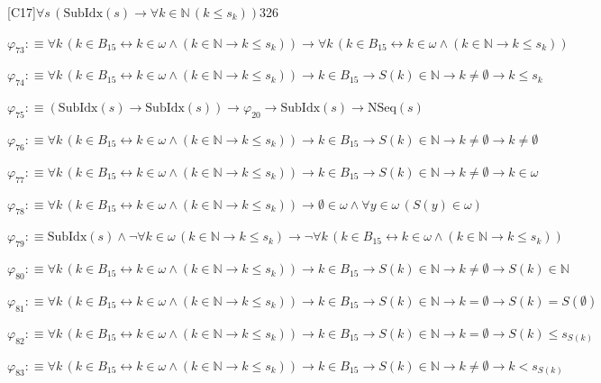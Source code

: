 \begin{fullproof}{[C17]}{$\forall s\,(\mathrm{SubIdx}(s) \to \forall k \in \mathbb{N}\,(k \leq s_{k}))$}{326}
\begin{abbrevlist}
\item $\varphi_{73} :\equiv \forall k\,(k \in B_{15} \leftrightarrow k \in \omega \land (k \in \mathbb{N} \to k \leq s_{k})) \to \forall k\,(k \in B_{15} \leftrightarrow k \in \omega \land (k \in \mathbb{N} \to k \leq s_{k}))$
\item $\varphi_{74} :\equiv \forall k\,(k \in B_{15} \leftrightarrow k \in \omega \land (k \in \mathbb{N} \to k \leq s_{k})) \to k \in B_{15} \to S(k) \in \mathbb{N} \to k \neq \emptyset \to k \leq s_{k}$
\item $\varphi_{75} :\equiv (\mathrm{SubIdx}(s) \to \mathrm{SubIdx}(s)) \to \varphi_{20} \to \mathrm{SubIdx}(s) \to \mathrm{NSeq}(s)$
\item $\varphi_{76} :\equiv \forall k\,(k \in B_{15} \leftrightarrow k \in \omega \land (k \in \mathbb{N} \to k \leq s_{k})) \to k \in B_{15} \to S(k) \in \mathbb{N} \to k \neq \emptyset \to k \neq \emptyset$
\item $\varphi_{77} :\equiv \forall k\,(k \in B_{15} \leftrightarrow k \in \omega \land (k \in \mathbb{N} \to k \leq s_{k})) \to k \in B_{15} \to S(k) \in \mathbb{N} \to k \neq \emptyset \to k \in \omega$
\item $\varphi_{78} :\equiv \forall k\,(k \in B_{15} \leftrightarrow k \in \omega \land (k \in \mathbb{N} \to k \leq s_{k})) \to \emptyset \in \omega \land \forall y \in \omega\,(S(y) \in \omega)$
\item $\varphi_{79} :\equiv \mathrm{SubIdx}(s) \land \neg \forall k \in \omega\,(k \in \mathbb{N} \to k \leq s_{k}) \to \neg \forall k\,(k \in B_{15} \leftrightarrow k \in \omega \land (k \in \mathbb{N} \to k \leq s_{k}))$
\item $\varphi_{80} :\equiv \forall k\,(k \in B_{15} \leftrightarrow k \in \omega \land (k \in \mathbb{N} \to k \leq s_{k})) \to k \in B_{15} \to S(k) \in \mathbb{N} \to k \neq \emptyset \to S(k) \in \mathbb{N}$
\item $\varphi_{81} :\equiv \forall k\,(k \in B_{15} \leftrightarrow k \in \omega \land (k \in \mathbb{N} \to k \leq s_{k})) \to k \in B_{15} \to S(k) \in \mathbb{N} \to k = \emptyset \to S(k) = S(\emptyset)$
\item $\varphi_{82} :\equiv \forall k\,(k \in B_{15} \leftrightarrow k \in \omega \land (k \in \mathbb{N} \to k \leq s_{k})) \to k \in B_{15} \to S(k) \in \mathbb{N} \to k = \emptyset \to S(k) \leq s_{S(k)}$
\item $\varphi_{83} :\equiv \forall k\,(k \in B_{15} \leftrightarrow k \in \omega \land (k \in \mathbb{N} \to k \leq s_{k})) \to k \in B_{15} \to S(k) \in \mathbb{N} \to k \neq \emptyset \to k < s_{S(k)}$

\end{abbrevlist}
\end{fullproof}
